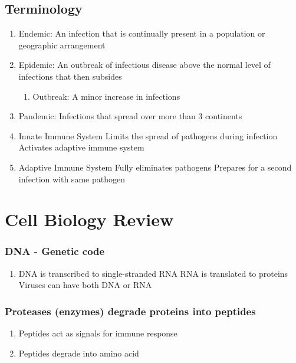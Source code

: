 \documentclass{notes}
\begin{document}
\subsection{Terminology}
\begin{enumerate}
    \item Endemic: An infection that is continually present in a population or geographic arrangement
    \item Epidemic: An outbreak of infectious disease above the normal level of infections that then subsides
          \begin{enumerate}
              \item Outbreak: A minor increase in infections
          \end{enumerate}
    \item Pandemic: Infections that spread over more than 3 continents
    \item Innate Immune System
          \subitem Limits the spread of pathogens during infection
          \subitem Activates adaptive immune system
    \item Adaptive Immune System
          \subitem Fully eliminates pathogens
          \subitem Prepares for a second infection with same pathogen
\end{enumerate}


\section{Cell Biology Review}

\subsubsection*{DNA - Genetic code}

\begin{enumerate}
    \item DNA is transcribed to single-stranded RNA
          \subitem RNA is translated to proteins
          \subitem Viruses can have both DNA or RNA
\end{enumerate}

\subsubsection*{Proteases (enzymes) degrade proteins into peptides}

\begin{enumerate}
    \item Peptides act as signals for immune response
    \item Peptides degrade into amino acid
\end{enumerate}
\end{document}
